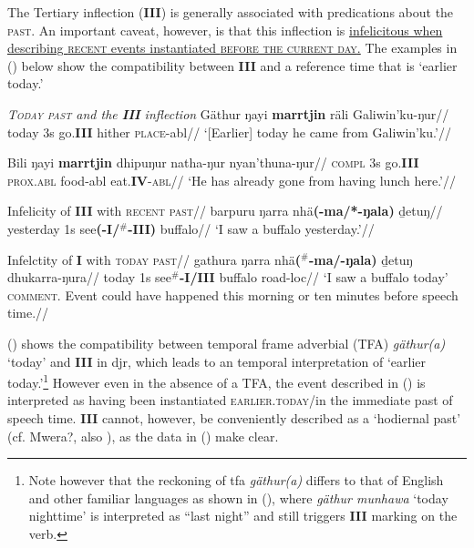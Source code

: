 The Tertiary inflection (\textbf{III}) is generally associated with predications about the \textsc{past}. An important caveat, however, is that this inflection is \ul{infelicitous when describing \textsc{recent} events instantiated \textsc{before the current day}.} The examples in (\nextx) below show the compatibility between \textbf{III} and a reference time that is `earlier today.'

\pex \textit{\textsc{Today past} and the \textbf{III} inflection}
\a{}\begingl\gla Gäthur ŋayi \textbf{marrtjin} räli Galiwin'ku-ŋur//
\glb today 3s go.\textbf{III} hither \textsc{place}-\gls{abl}//
\glft`[Earlier] today he came from Galiwin'ku.'//\endgl

\a{}\begingl\gla Bili ŋayi \textbf{marrtjin} dhipuŋur natha-ŋur nyan'thuna-ŋur//
\glb \textsc{compl} 3s go.\textbf{III} \textsc{prox.abl} food-\gls{abl} eat.\textbf{IV}-\textsc{abl}//
\glft`He has already gone from having lunch here.'//\endgl


\a\begingl\glpreamble Infelicity of \textbf{III} with \textsc{recent past}//
\gla barpuru ŋarra nhä\textbf{(-ma/*-ŋala)} ḏetuŋ//
\glb yesterday 1s see\textbf{(-I/$^\#$-III)} buffalo//
\glft`I saw a buffalo yesterday.'\trailingcitation[MD 20180802]//\endgl

\a\begingl\glpreamble Infelctity of \textbf{I} with \textsc{today past}//
\gla gathura ŋarra nhä\textbf{($^\#$-ma/-ŋala)} ḏetuŋ dhukarra-ŋura//
\glb today 1s see\textbf{$ ^\# $-I/III} buffalo road-\gls{loc}//
\glft `I saw a buffalo today'\trailingcitation{[MD 20180802]}\\\textsc{comment.} Event could have happened this morning or ten minutes before speech time.//\endgl
\xe

() shows the compatibility between temporal frame adverbial (TFA) \textit{gäthur(a)} `today' and \textbf{III} in \gls{djr}, which leads to an temporal interpretation of `earlier today.'\footnote{Note however that the reckoning of \gls{tfa} \textit{gäthur(a)} differs to that of English and other familiar languages as shown in (), where \textit{gäthur munhawa} `today nighttime' is interpreted as ``last night'' and still triggers \textbf{III} marking on the verb.} However even in the absence of a \gls{TFA}, the event described in () is interpreted as having been instantiated \textsc{earlier.today}/in the immediate past of speech time. \textbf{III} cannot, however, be conveniently described as a `hodiernal past' (cf. Mwera?, also \citealt[86]{Comrie1985}), as the data in (\nextx) make clear.


